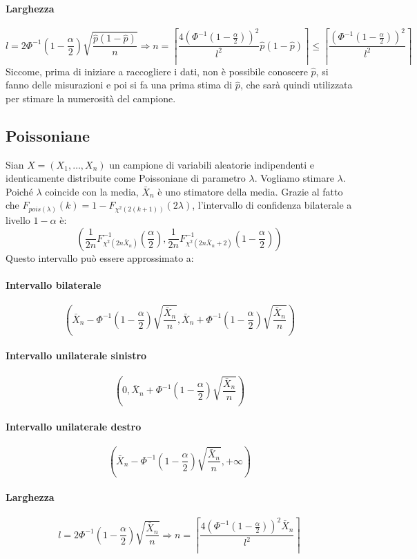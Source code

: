\documentclass[12pt, a4paper]{report}
\theoremstyle{definition}
\begin{document}
\paragraph{Larghezza}
\[l=2\Phi^{-1}\left(1-\frac{\alpha}{2}\right)\sqrt{\frac{\hat{p}
(1-\hat{p})}{n}}\Rightarrow n=\left\lceil\frac{4(\Phi^{-1}(1-\frac{\alpha}{2}))^2}
{l^2}\hat{p}(1-\hat{p})\right\rceil\leq\left\lceil\frac{(\Phi^{-1}(1-\frac{\alpha}
{2}))^2}{l^2}\right\rceil\]
Siccome, prima di iniziare a raccogliere i dati, non è possibile conoscere
$\hat{p}$, si fanno delle misurazioni e poi si fa una prima stima di $\hat{p}$,
che sarà quindi utilizzata per stimare la numerosità del campione.

\subsection{Poissoniane}
Sian $X=(X_1,\dots,X_n)$ un campione di variabili aleatorie indipendenti e
identicamente distribuite come Poissoniane di parametro $\lambda$. Vogliamo
stimare $\lambda$. Poiché $\lambda$ coincide con la media, $\bar{X}_n$ è uno
stimatore della media. Grazie al fatto che $F_{pois(\lambda)}(k)=1-F_{\chi^2
(2(k+1))}(2\lambda)$, l'intervallo di confidenza bilaterale a livello $1-\alpha$
è:
\[\left(\frac{1}{2n}F^{-1}_{\chi^2(2n\bar{X}_n)}\left(\frac{\alpha}{2}\right),
\frac{1}{2n}F^{-1}_{\chi^2(2n\bar{X}_n+2)}\left(1-\frac{\alpha}{2}\right)\right)\]
Questo intervallo può essere approssimato a:
\paragraph{Intervallo bilaterale}
\[\left(\bar{X}_n-\Phi^{-1}\left(1-\frac{\alpha}{2}\right)\sqrt{\frac{\bar{X}_n}
{n}},\bar{X}_n+\Phi^{-1}\left(1-\frac{\alpha}{2}\right)\sqrt{\frac{\bar{X}_n}{n}}
\right)\]
\paragraph{Intervallo unilaterale sinistro}
\[\left(0,\bar{X}_n+\Phi^{-1}\left(1-\frac{\alpha}{2}\right)\sqrt{\frac{\bar{X}_n}{n}}
\right)\]
\paragraph{Intervallo unilaterale destro}
\[\left(\bar{X}_n-\Phi^{-1}\left(1-\frac{\alpha}{2}\right)\sqrt{\frac{\bar{X}_n}{n}},
+\infty\right)\]
\paragraph{Larghezza}
\[l=2\Phi^{-1}\left(1-\frac{\alpha}{2}\right)\sqrt{\frac{\bar{X}_n}{n}}\Rightarrow
n=\left\lceil\frac{4\left(\Phi^{-1}\left(1-\frac{\alpha}{2}\right)\right)^2\bar{X}_n}
{l^2}\right\rceil\]
\end{document}
